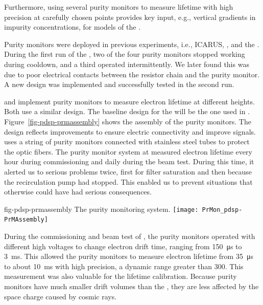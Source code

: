 Furthermore, using several purity monitors to measure lifetime with high precision at carefully chosen points provides key input, e.g.,  vertical gradients in impurity concentrations, for  models of the .

Purity monitors were deployed in previous  experiments, i.e., ICARUS, \microboone, and the . During the first run of the , two of the four purity monitors stopped working during cooldown, and a third operated intermittently. We later found this was due to poor electrical contacts between the resistor chain and the purity monitor. A new design was implemented and successfully tested in the second run. 



 and  %
implement purity monitors to %
measure electron lifetime at different heights.  
Both use a similar design. The baseline design for the   will be the one used in .
Figure~\ref{fig-pdsp-prmassembly} shows the assembly of the  purity monitors. The design reflects improvements to ensure electric connectivity and improve signals.  uses a string of purity monitors connected with stainless steel tubes to protect the optic fibers. The purity monitor system at  measured electron lifetime every hour during commissioning and daily during the beam test. During %
this time, it %
alerted us to serious problems twice, first %
for filter saturation and %
then because the recirculation pump had stopped. This enabled us to prevent %
situations that otherwise could have had serious consequences.

\begin{dunefigure}{fig-pdsp-prmassembly}
  {The  purity monitoring system.}
  \texttt{[image: PrMon\_pdsp-PrMAssembly]}
\end{dunefigure}



During the commissioning and beam test of , the purity monitors operated with different high voltages to change electron drift time, ranging from \SI{150}{\micro\second} to \SI{3}{\milli\second}. This allowed the  purity monitors to measure electron lifetime from \SI{35}{\micro\second} to about \SI{10}{\milli\second} with high precision, a dynamic range greater than \num{300}. 
This measurement was also valuable for the  lifetime calibration. Because purity monitors have much smaller drift volumes than the , they are less affected by the space charge caused by cosmic rays. 

